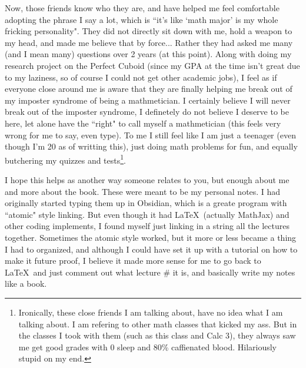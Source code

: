 \documentclass[12pt]{book}
\begin{document}
Now, those friends know who they are, and have helped me feel comfortable adopting the phrase I say a lot, which is ``it's like `math major' is my whole fricking personality".
They did not directly sit down with me, hold a weapon to my head, and made me believe that by force... Rather they had asked me many (and I mean many) questions over 2 years (at this point). 
Along with doing my research project on the Perfect Cuboid (since my GPA at the time isn't great due to my laziness, so of course I could not get other academic jobs), I feel as if everyone close around me is aware that they are finally helping me break out of my imposter syndrome of being a mathmetician. 
I certainly believe I will never break out of the imposter syndrome, I definetely do not believe I deserve to be here, let alone have the ``right" to call myself a mathmetician (this feels very wrong for me to say, even type). 
To me I still feel like I am just a teenager (even though I'm 20 as of writting this), just doing math problems for fun, and equally butchering my quizzes and tests\footnote{Ironically, these close friends I am talking about, have no idea what I am talking about. I am refering to other math classes that kicked my ass. But in the classes I took with them (such as this class and Calc 3), they always saw me get good grades with 0 sleep and 80\% caffienated blood. Hilariously stupid on my end.}. 

I hope this helps as another way someone relates to you, but enough about me and more about the book. These were meant to be my personal notes. 
I had originally started typing them up in Obsidian, which is a greate program with ``atomic" style linking. 
But even though it had \LaTeX ~(actually MathJax) and other coding implements, I found myself just linking in a string all the lectures together. 
Sometimes the atomic style worked, but it more or less became a thing I had to organized, and although I could have set it up with a tutorial on how to make it future proof, I believe it made more sense for me to go back to \LaTeX ~and just comment out what lecture \# it is, and basically write my notes like a book.
\end{document}
